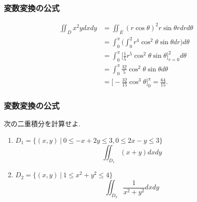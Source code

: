 


\begin{frame}
\frametitle{変数変換の公式}
\begin{align*}
\iint_D x^2y dxdy & = \iint_E (r \cos \theta)^2 r \sin \theta r dr d\theta \\
& = \int_0^\pi \big( \int_0^2 r^4 \cos^2 \theta \sin \theta dr \big) d\theta \\
& = \int_0^\pi \big[ \frac{1}{5}r^5 \cos^2 \theta \sin \theta \big]_{r=0}^2 d\theta \\
& = \int_0^\pi \frac{32}{5} \cos^2 \theta \sin \theta d\theta \\
& = \big[-\frac{32}{15} \cos^3 \theta\big]_0^\pi = \frac{64}{15}. 
\end{align*}

\end{frame}




\begin{frame}
\frametitle{変数変換の公式}


\begin{Prob}
次の二重積分を計算せよ. 
\begin{enumerate}
\item $D_1=\{(x,y) \ | \ 0 \le -x+2y \le 3, 0 \le 2x-y \le 3\}$
$$\iint_{D_1} (x+y) dxdy$$
\item $D_2=\{(x,y) \ | \  1 \le x^2+y^2 \le 4\}$
$$
\iint_{D_2} \frac{1}{x^2+y^2}dxdy
$$
\end{enumerate}
\end{Prob}

\end{frame}






